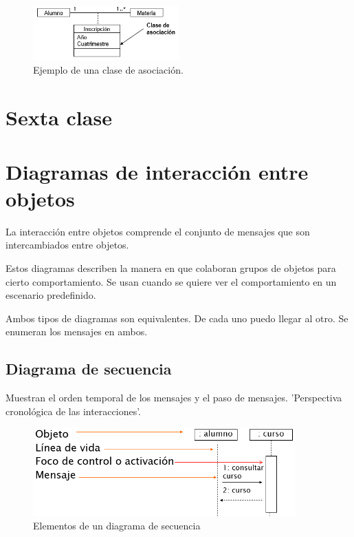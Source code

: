 \documentclass[titlepage,a4paper]{article}
\begin{document}
\begin{figure}[!htb]
    \centering
    \includegraphics[width=0.5\textwidth]{Imagenes/ClaseDeAsociacion.png}
    \caption{Ejemplo de una clase de asociación.}
\end{figure}


\newpage

\section*{Sexta clase}
\section{Diagramas de interacción entre objetos}
La interacción entre objetos comprende el conjunto de mensajes que son intercambiados entre objetos.

Estos diagramas describen la manera en que colaboran grupos de objetos para cierto comportamiento. Se usan cuando se quiere ver el comportamiento en un escenario predefinido.

Ambos tipos de diagramas son equivalentes. De cada uno puedo llegar al otro. Se enumeran los mensajes en ambos.

\subsection{Diagrama de secuencia}
Muestran el orden temporal de los mensajes y el paso de mensajes. 'Perspectiva cronológica de las interacciones'.

\begin{figure}[!htb]
    \centering
    \includegraphics[width=0.9\textwidth]{Imagenes/DiagramaDeSecuencia.png}
    \caption{Elementos de un diagrama de secuencia}
\end{figure}
\end{document}
